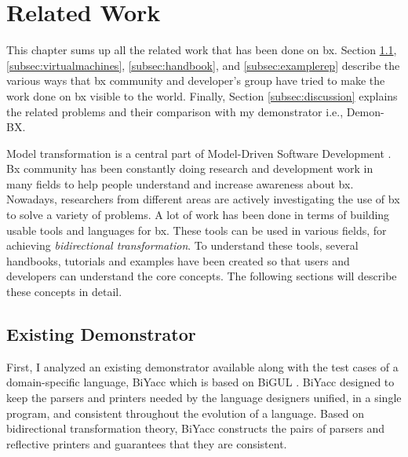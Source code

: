 \section{Related Work}\label{sec:relatedwork}
This chapter sums up all the related work that has been done on bx. Section \ref{subsec:existingdemo}, \ref{subsec:virtualmachines}, \ref{subsec:handbook}, and \ref{subsec:examplerep} describe the various ways that bx community and developer's group have tried to make the work done on bx visible to the world. Finally, Section \ref{subsec:discussion} explains the related problems and their comparison with my demonstrator i.e., Demon-BX. 

Model transformation is a central part of Model-Driven Software Development \cite{bx-grace} \cite{bx-dagstuhl}. Bx community has been constantly doing research and development work in many fields to help people understand and increase awareness about bx. Nowadays, researchers from different areas are actively investigating the use of bx to solve a variety of problems. A lot of work has been done in terms of building usable tools and languages for bx. These tools can be used in various fields, for achieving \textit{bidirectional transformation}. To understand these tools, several handbooks, tutorials and examples have been created so that users and developers can understand the core concepts. The following sections will describe these concepts in detail.

\subsection{Existing Demonstrator}\label{subsec:existingdemo}
First, I analyzed an existing demonstrator available along with the test cases of a domain-specific language, BiYacc \cite{biyacc} which is based on BiGUL \cite{bigul}. BiYacc designed to keep the parsers and printers needed by the language designers unified, in a single program, and consistent throughout the evolution of a language. Based on bidirectional transformation theory, BiYacc constructs the pairs of parsers and reflective printers and guarantees that they are consistent.

